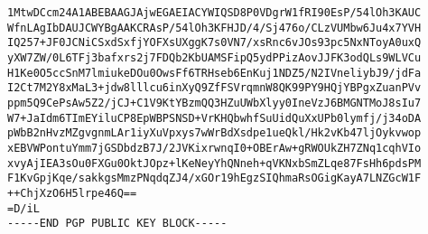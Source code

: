 \begin{verbatim}
1MtwDCcm24A1ABEBAAGJAjwEGAEIACYWIQSD8P0VDgrW1fRI90EsP/54lOh3KAUC
WfnLAgIbDAUJCWYBgAAKCRAsP/54lOh3KFHJD/4/Sj476o/CLzVUMbw6Ju4x7YVH
IQ257+JF0JCNiCSxdSxfjYOFXsUXggK7s0VN7/xsRnc6vJOs93pc5NxNToyA0uxQ
yXW7ZW/0L6TFj3bafxrs2j7FDQb2KbUAMSFipQ5ydPPizAovJJFK3odQLs9WLVCu
H1Ke0O5ccSnM7lmiukeDOu0OwsFf6TRHseb6EnKuj1NDZ5/N2IVneliybJ9/jdFa
I2Ct7M2Y8xMaL3+jdw8lllcu6inXyQ9ZfFSVrqmnW8QK99PY9HQjYBPgxZuanPVv
ppm5Q9CePsAw5Z2/jCJ+C1V9KtYBzmQQ3HZuUWbXlyy0IneVzJ6BMGNTMoJ8sIu7
W7+JaIdm6TImEYiluCP8EpWBPSNSD+VrKHQbwhfSuUidQuXxUPb0lymfj/j34oDA
pWbB2nHvzMZgvgnmLAr1iyXuVpxys7wWrBdXsdpe1ueQkl/Hk2vKb47ljOykvwop
xEBVWPontuYmm7jGSDbdzB7J/2JVKixrwnqI0+OBErAw+gRWOUkZH7ZNq1cqhVIo
xvyAjIEA3sOu0FXGu0OktJOpz+lKeNeyYhQNneh+qVKNxbSmZLqe87FsHh6pdsPM
F1KvGpjKqe/sakkgsMmzPNqdqZJ4/xGOr19hEgzSIQhmaRsOGigKayA7LNZGcW1F
++ChjXzO6H5lrpe46Q==
=D/iL
-----END PGP PUBLIC KEY BLOCK-----
\end{verbatim}

